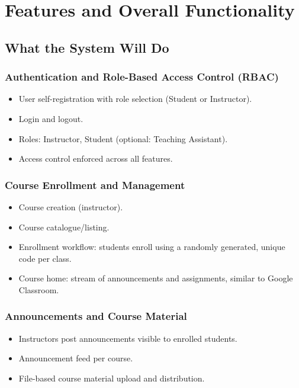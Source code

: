 \documentclass[11pt, legalpaper]{article}
\begin{document}
\section{Features and Overall Functionality}

\subsection{What the System Will Do}

\subsubsection{Authentication and Role-Based Access Control (RBAC)}
\begin{itemize}
  \item User self-registration with role selection (Student or Instructor).
  \item Login and logout.
  \item Roles: Instructor, Student (optional: Teaching Assistant).
  \item Access control enforced across all features.
\end{itemize}

\subsubsection{Course Enrollment and Management}
\begin{itemize}
  \item Course creation (instructor).
  \item Course catalogue/listing.
  \item Enrollment workflow: students enroll using a randomly generated,
        unique code per class.
  \item Course home: stream of announcements and assignments, similar to
        Google Classroom.
\end{itemize}

\subsubsection{Announcements and Course Material}
\begin{itemize}
  \item Instructors post announcements visible to enrolled students.
  \item Announcement feed per course.
  \item File-based course material upload and distribution.
\end{itemize}
\end{document}
